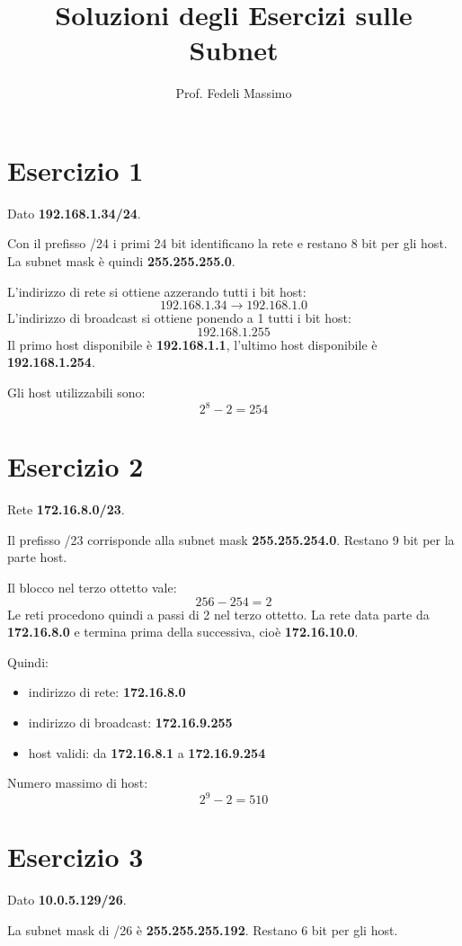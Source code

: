 \documentclass[a4paper,12pt]{article}
\title{Soluzioni degli Esercizi sulle Subnet}
\author{Prof. Fedeli Massimo}
\date{}
\begin{document}
\maketitle

\section*{Esercizio 1}
Dato \textbf{192.168.1.34/24}.

Con il prefisso /24 i primi 24 bit identificano la rete e restano 8 bit per gli host. La subnet mask è quindi \textbf{255.255.255.0}.

L'indirizzo di rete si ottiene azzerando tutti i bit host:
\[
192.168.1.34 \rightarrow 192.168.1.0
\]
L'indirizzo di broadcast si ottiene ponendo a 1 tutti i bit host:
\[
192.168.1.255
\]
Il primo host disponibile è \textbf{192.168.1.1}, l'ultimo host disponibile è \textbf{192.168.1.254}.

Gli host utilizzabili sono:
\[
2^8 - 2 = 254
\]

\section*{Esercizio 2}
Rete \textbf{172.16.8.0/23}.

Il prefisso /23 corrisponde alla subnet mask \textbf{255.255.254.0}. Restano 9 bit per la parte host.

Il blocco nel terzo ottetto vale:
\[
256 - 254 = 2
\]
Le reti procedono quindi a passi di 2 nel terzo ottetto. La rete data parte da \textbf{172.16.8.0} e termina prima della successiva, cioè \textbf{172.16.10.0}.

Quindi:
\begin{itemize}
    \item indirizzo di rete: \textbf{172.16.8.0}
    \item indirizzo di broadcast: \textbf{172.16.9.255}
    \item host validi: da \textbf{172.16.8.1} a \textbf{172.16.9.254}
\end{itemize}

Numero massimo di host:
\[
2^9 - 2 = 510
\]

\section*{Esercizio 3}
Dato \textbf{10.0.5.129/26}.

La subnet mask di /26 è \textbf{255.255.255.192}. Restano 6 bit per gli host.
\end{document}

